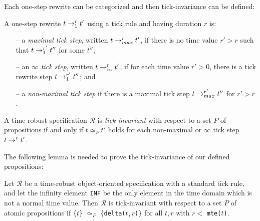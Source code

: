 {Each one-step rewrite can be categorized and then tick-invariance can
be defined:
\begin{definition}
A one-step rewrite $t\rightarrow^{r}_{1}t'$ using a tick rule and having
duration $r$ is:
\begin{itemize}
\item[--] a \emph{maximal tick step}, written $t\rightarrow^{r}_{max}t'$, if
  there is no time value $r'>r$ such that $t\rightarrow^{r'}_{1}t''$ for some
  $t''$;
\item[--] an \emph{$\infty$ tick step}, written $t\rightarrow^{r}_{\infty}t'$,
  if for each time value $r'>0$, there is a tick rewrite step
  $t\rightarrow^{r'}_{1}t''$; and
\item[--] a \emph{non-maximal tick step} if there is a maximal tick
  step $t\rightarrow^{r'}_{max}t''$ for $r'>r$.
\end{itemize}
\end{definition}
\begin{definition}
  A time-robust specification $\mathcal{R}$ is \emph{tick-invariant} with
  respect to a set $P$ of propositions if and only if $t\simeq_P t'$
  holds for each non-maximal or $\infty$ tick step $t\rightarrow^{r}_{}t'$.
\end{definition}

The following lemma is needed to prove the tick-invariance of our
defined propositions:
\begin{lemma}
\label{l:tickinv}
Let $\mathcal{R}$ be a time-robust object-oriented specification with a
standard tick rule, and let the infinity element \verb|INF| be the
only element in the time domain which is not a normal time value.
Then $\mathcal{R}$ is tick-invariant with respect to a set $P$ of atomic
propositions if \verb|{|$t$\verb|}| $\simeq_P$
\verb|{delta(|$t$\verb|,|$r$\verb|)}| for all $t,r$ with $r<$
\verb|mte(|$t$\verb|)|.
\end{lemma}

\newcommand{\mteTask}[2]{\texttt{mteTask(}#1\texttt{,}#2\texttt{)}}
\newcommand{\deltaTask}[3]{\texttt{deltaTask(}#1\texttt{,}#2\texttt{,}#3\texttt{)}}
\newcommand{\mteIS}[1]{\texttt{mteIS(}#1\texttt{)}}
\newcommand{\deltaIS}[2]{\texttt{deltaIS(}#1\texttt{,}#2\texttt{)}}
\newcommand{\IntSrc}[3]{\texttt{<}#1\texttt{:IntSrc|val:}#2\texttt{,cycle:}#3\texttt{>}}
\newcommand{\mteIr}[1]{\texttt{mteIr(}#1\texttt{)}}
\newcommand{\mteS}[1]{\texttt{mte(}#1\texttt{)}}
\newcommand{\deltaS}[2]{\texttt{delta(}#1\texttt{,}#2\texttt{)}}
 
}
